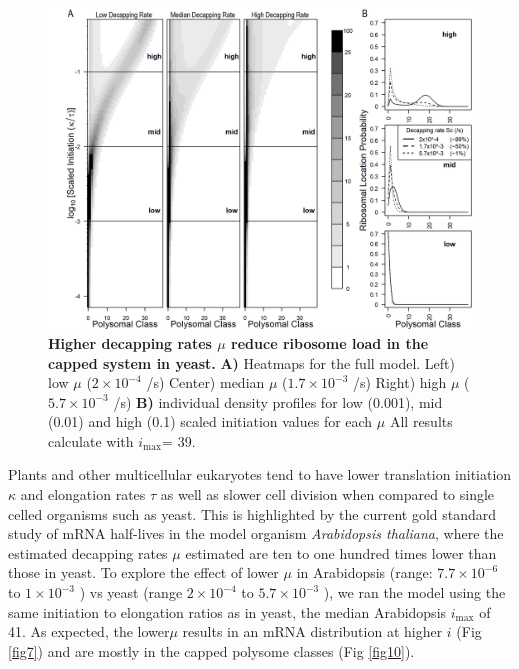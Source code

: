 \documentclass[10pt,letterpaper]{article}
\newcommand{\imax}{\ensuremath{{i_{\max}}}\xspace}
\begin{document}
\begin{figure}[!h]
\begin{center}
\includegraphics[width=140mm]{Images/2023-07-09_Figure2_Marking_Rate_range_medianlength_with_labels.png}
\caption{{\bf Higher decapping rates $\mu$ reduce ribosome load in the capped system in yeast.}  {\bf A)}  Heatmaps for the full model. Left) low $\mu$ ($2\times 10^{-4}$ /s) Center) median $\mu$ ($1.7\times 10^{-3}$ /s) Right) high $\mu$ ($5.7\times 10^{-3}$ /s) {\bf  B)} individual density profiles for low (0.001), mid (0.01) and high (0.1) scaled initiation values for each $\mu$ All results calculate with \imax = 39.}
\label{fig6}
\end{center}
\end{figure}


Plants and other multicellular eukaryotes tend to have lower translation initiation $\kappa$ and elongation rates $\tau$ as well as slower cell division when compared to single celled organisms such as yeast.
This is highlighted by the current gold standard study of mRNA half-lives in the model organism \textit{Arabidopsis thaliana}, where the estimated decapping rates $\mu$ estimated are ten to one hundred times lower than those in yeast. 
To explore the effect of lower $\mu$ in Arabidopsis (range: $7.7 \times 10^{-6}$ to $1 \times 10^{-3}$ ) vs yeast (range $2 \times 10^{-4}$ to $5.7 \times 10^{-3}$ ), we ran the model using the same initiation to elongation ratios as in yeast, the median Arabidopsis \imax of 41. 
As expected, the lower$\mu$ results in an mRNA distribution at higher $i$ (Fig \ref{fig7}) and are mostly in the capped polysome classes (Fig \ref{fig10}).
\end{document}
